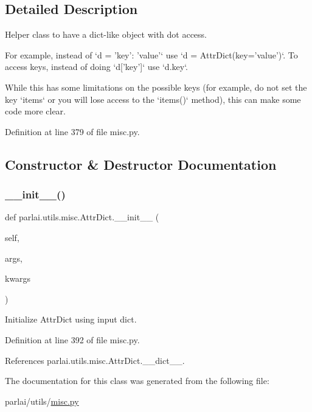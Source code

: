 \subsection{Detailed Description}
\begin{DoxyVerb}Helper class to have a dict-like object with dot access.

For example, instead of `d = {'key': 'value'}` use
`d = AttrDict(key='value')`.
To access keys, instead of doing `d['key']` use `d.key`.

While this has some limitations on the possible keys (for example, do not
set the key `items` or you will lose access to the `items()` method), this
can make some code more clear.
\end{DoxyVerb}
 

Definition at line 379 of file misc.\+py.



\subsection{Constructor \& Destructor Documentation}
\mbox{\label{classparlai_1_1utils_1_1misc_1_1AttrDict_a8a0ed33202adee184fc7ec06cf89a7ba}} 
\subsubsection{\texorpdfstring{\+\_\+\+\_\+init\+\_\+\+\_\+()}{\_\_init\_\_()}}
{\footnotesize\ttfamily def parlai.\+utils.\+misc.\+Attr\+Dict.\+\_\+\+\_\+init\+\_\+\+\_\+ (\begin{DoxyParamCaption}\item[{}]{self,  }\item[{}]{args,  }\item[{}]{kwargs }\end{DoxyParamCaption})}

\begin{DoxyVerb}Initialize AttrDict using input dict.\end{DoxyVerb}
 

Definition at line 392 of file misc.\+py.



References parlai.\+utils.\+misc.\+Attr\+Dict.\+\_\+\+\_\+dict\+\_\+\+\_\+.



The documentation for this class was generated from the following file\+:\begin{DoxyCompactItemize}
\item 
parlai/utils/\hyperlink{misc_8py}{misc.\+py}\end{DoxyCompactItemize}
